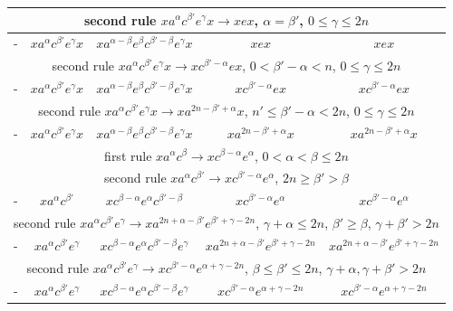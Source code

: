 \documentclass{article}
\theoremstyle{definition}
\begin{document}
\begin{center}
\begin{tabular}{|c|c|c|c|c|}
\hline
\multicolumn{5}{|c|}{second rule $x a^\alpha c^{\beta'} e^\gamma x \rightarrow x e x$, $\alpha=\beta'$, $0 \le \gamma \le 2n$}\\
\hline
- &  $ x a^\alpha c^{\beta'}  e^\gamma x $ &  $ x  a^{\alpha - \beta} e^\beta c^{\beta'-\beta} e^\gamma  x $ &   $   x e   x  $ &  $ x  e x $\\
\hline
\multicolumn{5}{|c|}{second rule $x a^\alpha c^{\beta'} e^\gamma x \rightarrow x c^{\beta'-\alpha} e x$, $0<\beta'-\alpha<n$, $0 \le \gamma \le 2n$}\\
\hline
- &  $ x a^\alpha c^{\beta'}  e^\gamma x $ &  $ x  a^{\alpha - \beta} e^\beta c^{\beta'-\beta} e^\gamma  x $ &  $   x c^{\beta'-\alpha} e   x  $ & $ x c^{\beta'-\alpha} e  x $\\
\hline
\multicolumn{5}{|c|}{second rule $x a^\alpha c^{\beta'} e^\gamma x \rightarrow x a^{2n-\beta'+\alpha} x$, $n'\le\beta'-\alpha<2n$, $0 \le \gamma \le 2n$}\\
\hline
- &  $ x a^\alpha c^{\beta'}  e^\gamma x $ &  $ x  a^{\alpha - \beta} e^\beta c^{\beta'-\beta} e^\gamma  x $ &  $   x  a^{2n-\beta'+\alpha}  x  $ & $ x  a^{2n-\beta'+\alpha} x $\\
\hline
\hline
\multicolumn{5}{|c|}{first rule $x a^\alpha c^\beta \rightarrow x c^{\beta - \alpha} e^\alpha$, $0< \alpha <\beta \le 2n$}\\
\hline
\hline
\multicolumn{5}{|c|}{second rule $x a^\alpha c^{\beta'} \rightarrow x c^{\beta' -\alpha} e^{\alpha}$, $2n \ge \beta' > \beta$}\\
\hline
- & $ x a^\alpha c^{\beta'}  $ &  $  x  c^{\beta - \alpha} e^\alpha c^{\beta'-\beta}  $ &   $   x c^{\beta'-\alpha} e^{\alpha} $ &  $ x c^{\beta'-\alpha} e^{\alpha}  $ \\
\hline
\multicolumn{5}{|c|}{second rule $x a^\alpha c^{\beta'} e^\gamma \rightarrow x a^{2n+\alpha -\beta'} e^{\beta'+\gamma-2n}$, $\gamma+\alpha \le 2n$, $\beta' \ge \beta$, $\gamma+\beta'>2n$}\\
\hline
- & $ x a^\alpha c^{\beta'} e^\gamma $ &  $  x  c^{\beta - \alpha} e^\alpha c^{\beta'-\beta} e^\gamma  $ &   $   x a^{2n+\alpha -\beta'} e^{\beta'+\gamma-2n} $ &  $ x a^{2n+\alpha -\beta'} e^{\beta'+\gamma-2n}  $ \\
\hline
\multicolumn{5}{|c|}{second rule $x a^\alpha c^{\beta'} e^\gamma \rightarrow x c^{\beta' - \alpha} e^{\alpha+\gamma-2n}$,  $\beta\le\beta' \le 2n$, $\gamma+\alpha, \gamma+\beta' > 2n$}\\
\hline
- & $ x a^\alpha c^{\beta'} e^\gamma $ &  $  x  c^{\beta - \alpha} e^\alpha c^{\beta'-\beta} e^\gamma  $ &   $   x c^{\beta' - \alpha} e^{\alpha+\gamma-2n} $ &  $ x c^{\beta' - \alpha} e^{\alpha+\gamma-2n}  $ \\

\end{tabular}
\end{center}
\end{document}
